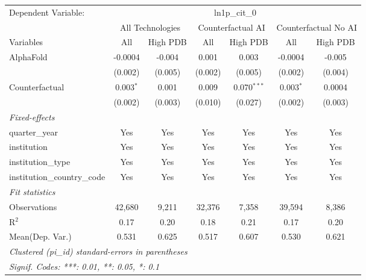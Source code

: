 \begingroup
\centering
\begin{tabular}{lcccccc}
   \tabularnewline \midrule \midrule
   Dependent Variable: & \multicolumn{6}{c}{ln1p\_cit\_0}\\
 & \multicolumn{2}{c}{All Technologies} & \multicolumn{2}{c}{Counterfactual AI} & \multicolumn{2}{c}{Counterfactual No AI} \\
\cmidrule(lr){1-1}\cmidrule(lr){2-3} \cmidrule(lr){4-5} \cmidrule(lr){6-7}
Variables & \multicolumn{1}{c}{All} & \multicolumn{1}{c}{High PDB} & \multicolumn{1}{c}{All} & \multicolumn{1}{c}{High PDB} & \multicolumn{1}{c}{All} & \multicolumn{1}{c}{High PDB} \\
\cmidrule(lr){1-1}\cmidrule(lr){2-2} \cmidrule(lr){3-3} \cmidrule(lr){4-4} \cmidrule(lr){5-5} \cmidrule(lr){6-6} \cmidrule(lr){7-7}
   AlphaFold                    & -0.0004     & -0.004  & 0.001   & 0.003         & -0.0004     & -0.005\\   
                                & (0.002)     & (0.005) & (0.002) & (0.005)       & (0.002)     & (0.004)\\   
   Counterfactual               & 0.003$^{*}$ & 0.001   & 0.009   & 0.070$^{***}$ & 0.003$^{*}$ & 0.0004\\   
                                & (0.002)     & (0.003) & (0.010) & (0.027)       & (0.002)     & (0.003)\\   
   \midrule
   \emph{Fixed-effects}\\
   quarter\_year                & Yes         & Yes     & Yes     & Yes           & Yes         & Yes\\  
   institution                  & Yes         & Yes     & Yes     & Yes           & Yes         & Yes\\  
   institution\_type            & Yes         & Yes     & Yes     & Yes           & Yes         & Yes\\  
   institution\_country\_code   & Yes         & Yes     & Yes     & Yes           & Yes         & Yes\\  
   \midrule
   \emph{Fit statistics}\\
   Observations                 & 42,680      & 9,211   & 32,376  & 7,358         & 39,594      & 8,386\\  
   R$^2$                        & 0.17        & 0.20    & 0.18    & 0.21          & 0.17        & 0.20\\  
Mean(Dep. Var.) & 0.531 & 0.625 & 0.517 & 0.607 & 0.530 & 0.621 \\
   \midrule \midrule
   \multicolumn{7}{l}{\emph{Clustered (pi\_id) standard-errors in parentheses}}\\
   \multicolumn{7}{l}{\emph{Signif. Codes: ***: 0.01, **: 0.05, *: 0.1}}\\
\end{tabular}
\par\endgroup
